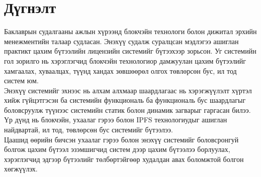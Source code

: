 \chapter{Дүгнэлт}
\indent Баклаврын судалгааны ажлын хүрээнд блокчэйн технологи болон дижитал эрхийн менежментийн талаар судласан. Энэхүү судалж суралцсан мэдлэгээ ашиглан практикт цахим бүтээлийн лицензийн системийг бүтээхээр зорьсон. Уг системийн гол зорилго нь хэрэглэгчид блокчэйн технологиор дамжуулан цахим бүтээлийг хамгаалах, хуваалцах, түүнд хандах зөвшөөрөл олгох төвлөрсөн бус, ил тод систем юм.
\\ \indent Энэхүү системийг эхнээс нь алхам алхмаар шаардлагаас нь хэрэгжүүлэлт хүртэл хийж гүйцэтгэсэн ба системийн функциональ ба функциональ бус шаардлагыг боловсруулж түүнээс системийн статик болон динамик загварыг гаргасан билээ. Үр дүнд нь блокчэйн, ухаалаг гэрээ болон IPFS технологиудыг ашиглан найдвартай, ил тод, төвлөрсөн бус системийг бүтээлээ.
\\ \indent Цаашид өөрийн бичсэн ухаалаг гэрээ болон энэхүү системийг боловсронгуй болгож цахим бүтээл эзэмшигчид систем дээр цахим бүтээлээ борлуулах, хэрэглэгчид эдгээр бүтээлийг төлбөртэйгөөр худалдан авах боломжтой болгон хөгжүүлэх.